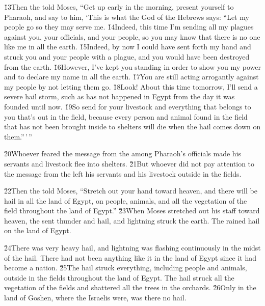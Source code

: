 \v{13}Then the  told Moses, ``Get up early in the morning, present yourself to Pharaoh, and say to him, `This is what the  God of the Hebrews says: ``Let my people go so they may serve me. \v{14}Indeed, this time I'm sending all my plagues against you, your officials, and your people, so you may know that there is no one like me in all the earth. \v{15}Indeed, by now I could have sent forth my hand and struck you and your people with a plague, and you would have been destroyed from the earth. \v{16}However, I've kept you standing in order to show you my power and to declare my name in all the earth. \v{17}You are still acting arrogantly against my people by not letting them go. \v{18}Look! About this time tomorrow, I'll send a severe hail storm, such as has not happened in Egypt from the day it was founded until now. \v{19}So send for your livestock and everything that belongs to you that's out in the field, because every person and animal found in the field that has not been brought inside to shelters will die when the hail comes down on them.''\,'\,''

\v{20}Whoever feared the message from the  among Pharaoh's officials made his servants and livestock flee into shelters. \v{21}But whoever did not pay attention to the message from the  left his servants and his livestock outside in the fields.

\v{22}Then the  told Moses, ``Stretch out your hand toward heaven, and there will be hail in all the land of Egypt, on people, animals, and all the vegetation of the field throughout the land of Egypt.'' \v{23}When Moses stretched out his staff toward heaven, the  sent thunder and hail, and lightning struck the earth. The  rained hail on the land of Egypt.

\v{24}There was very heavy hail, and lightning was flashing continuously in the midst of the hail. There had not been anything like it in the land of Egypt since it had become a nation. \v{25}The hail struck everything, including people and animals, outside in the fields throughout the land of Egypt. The hail struck all the vegetation of the fields and shattered all the trees in the orchards. \v{26}Only in the land of Goshen, where the Israelis were, was there no hail.

